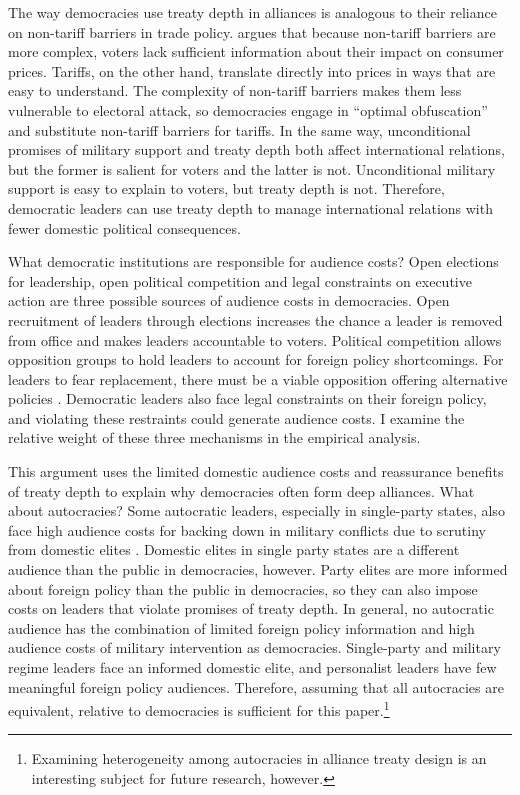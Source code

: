 \documentclass[12pt]{article}
\begin{document}
The way democracies use treaty depth in alliances is analogous to their reliance on non-tariff barriers in trade policy.
\citet{Kono2006} argues that because non-tariff barriers are more complex, voters lack sufficient information about their impact on consumer prices.
Tariffs, on the other hand, translate directly into prices in ways that are easy to understand.
The complexity of non-tariff barriers makes them less vulnerable to electoral attack, so democracies engage in ``optimal obfuscation'' and substitute non-tariff barriers for tariffs. 
In the same way, unconditional promises of military support and treaty depth both affect international relations, but the former is salient for voters and the latter is not. 
Unconditional military support is easy to explain to voters, but treaty depth is not. 
Therefore, democratic leaders can use treaty depth to manage international relations with fewer domestic political consequences.


What democratic institutions are responsible for audience costs? 
Open elections for leadership, open political competition and legal constraints on executive action are three possible sources of audience costs in democracies. 
Open recruitment of leaders through elections increases the chance a leader is removed from office and makes leaders accountable to voters. 
Political competition allows opposition groups to hold leaders to account for foreign policy shortcomings. 
For leaders to fear replacement, there must be a viable opposition offering alternative policies \citep{PotterBaum2014}.
Democratic leaders also face legal constraints on their foreign policy, and violating these restraints could generate audience costs. 
I examine the relative weight of these three mechanisms in the empirical analysis.  


This argument uses the limited domestic audience costs and reassurance benefits of treaty depth to explain why democracies often form deep alliances. 
What about autocracies? 
Some autocratic leaders, especially in single-party states, also face high audience costs for backing down in military conflicts due to scrutiny from domestic elites \citep{Weeks2014}.
Domestic elites in single party states are a different audience than the public in democracies, however.  
Party elites are more informed about foreign policy than the public in democracies, so they can also impose costs on leaders that violate promises of treaty depth. 
In general, no autocratic audience has the combination of limited foreign policy information and high audience costs of military intervention as democracies.
Single-party and military regime leaders face an informed domestic elite, and personalist leaders have few meaningful foreign policy audiences. 
Therefore, assuming that all autocracies are equivalent, relative to democracies is sufficient for this paper.\footnote{Examining heterogeneity among autocracies in alliance treaty design is an interesting subject for future research, however.} 
\end{document}
